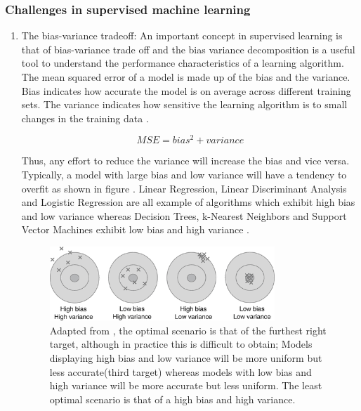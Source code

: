 \subsubsection{Challenges in supervised machine learning}
\begin{enumerate}
\item{The bias-variance tradeoff:}\newline
An important concept in supervised learning is that of bias-variance trade off and the bias variance decomposition is a useful tool to understand the performance characteristics of a learning algorithm. The  mean squared error of a model is made up of the bias and the variance. Bias indicates how accurate the model is on average across different training sets. The variance indicates how sensitive the learning algorithm is to small changes in the training data \citep{Sammut:2016gd}.

\begin{equation}
        MSE = bias^2 + variance
\end{equation}

Thus, any effort to reduce the variance will increase the bias and vice versa. Typically, a model with large bias and low variance will have a tendency to overfit as shown in figure . Linear Regression, Linear Discriminant Analysis and Logistic Regression are all example of algorithms which exhibit high bias and low variance \citep{Anonymous:2016um} whereas Decision Trees, k-Nearest Neighbors and Support Vector Machines exhibit low bias and high variance \citep{Anonymous:2016um}.

\begin{figure}[H]
    \centering
    \includegraphics[width=0.8\textwidth]{ThesisTemplate/usingLatex/images/biasvariance.png}
    \caption{Adapted from \citep{Sammut:2017vv}, the optimal scenario is that of the furthest right target, although in practice this is difficult to obtain; Models displaying high bias and low variance will be more uniform but less accurate(third target) whereas models with low bias and high variance will be more accurate but less uniform. The least optimal scenario is that of a high bias and high variance.}
    \label{fig:my_label}
\end{figure}


\end{enumerate}
